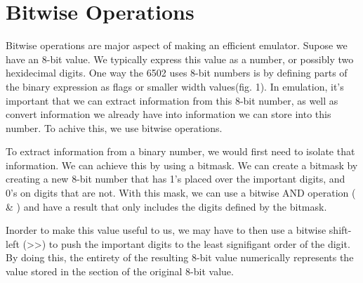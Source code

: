 \documentclass[12pt]{article}
\newcommand{\singlespace}{
  \protect\renewcommand\baselinestretch{1.0}
  \protect\normalsize
}
\begin{document}
\section{Bitwise Operations}
\label{sec:bitwise}
Bitwise operations are major aspect of making an efficient emulator. Supose we have an 8-bit value.
We typically express this value as a number, or possibly two hexidecimal digits. One way the 6502 uses
8-bit numbers is by defining parts of the binary expression as flags or smaller width values(fig. 1).
In emulation, it's important that we can extract information from this 8-bit number, as well as convert
information we already have into information we can store into this number. To achive this, we use
bitwise operations.

To extract information from a binary number, we would first need to isolate that information. We can
achieve this by using a bitmask. We can create a bitmask by creating a new 8-bit number that has
1's placed over the important digits, and 0's on digits that are not. With this mask, we can use a
bitwise AND operation ( \& ) and have a result that only includes the digits defined by the bitmask.

Inorder to make this value useful to us, we may have to then use a bitwise shift-left (>>) to push
the important digits to the least signifigant order of the digit. By doing this, the entirety of the
resulting 8-bit value numerically represents the value stored in the section of the original 8-bit
value.

\singlespace




\end{document}
